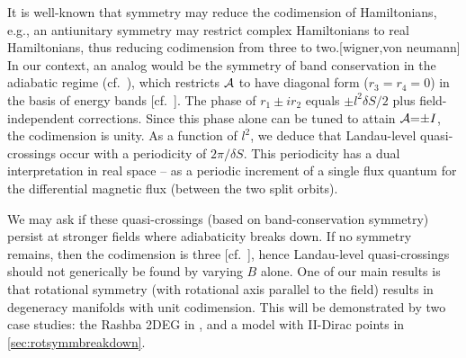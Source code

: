 \documentclass[aps, prb, showpacs, twocolumn, notitlepage, superscriptaddress]{revtex4-1}
\begin{document}

It is well-known that symmetry may reduce the codimension of Hamiltonians, e.g., an antiunitary symmetry may restrict complex Hamiltonians to real Hamiltonians, thus reducing codimension from three to two.[wigner,von neumann] In our context, an analog would be the symmetry of band conservation in the adiabatic regime (cf.\ ), which restricts ${\cal A}$ to have diagonal form  ($r_3{=}r_4{=}0$) in the basis of energy bands [cf.\ ]. The phase of $r_1{\pm}ir_2$ equals ${\pm} l^2\delta S/2$ plus field-independent corrections. Since this  phase alone  can be  tuned to attain ${\cal A}{=}{\pm}I$, the codimension is unity. As a function of $l^2$, we deduce that Landau-level quasi-crossings occur  with a periodicity of $2\pi/\delta S$. This periodicity  has a dual interpretation  in real space -- as a periodic increment of a single flux quantum for  the differential magnetic flux (between the two split orbits).


We may ask if these quasi-crossings (based on band-conservation symmetry) persist at stronger fields where adiabaticity breaks down. If no symmetry remains, then the codimension is three [cf.\ ], hence Landau-level quasi-crossings should not generically be found by varying $B$ alone. One of our main results is that  rotational symmetry (with rotational axis parallel to the field) results in degeneracy manifolds with unit codimension. This will be demonstrated by two  case studies: the Rashba 2DEG in , and a model with II-Dirac points in \ref{sec:rotsymmbreakdown}. 








\end{document}
